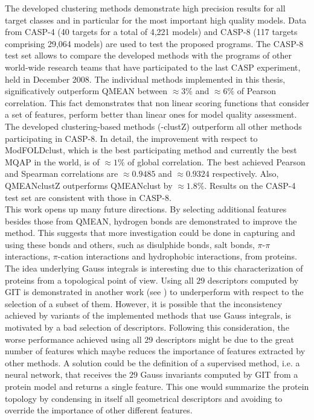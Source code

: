 The developed clustering methods demonstrate high precision results for all target classes and in particular for the most important high quality models. Data from CASP-4 (40 targets for a total of 4,221 models) and CASP-8 (117 targets comprising 29,064 models) are used to test the proposed programs. The CASP-8 test set allows to compare the developed methods with the programs of other world-wide research teams that have participated to the last CASP experiment, held in December 2008. The individual methods implemented in this thesis, significatively outperform QMEAN between $\approx 3\%$ and $\approx 6\%$ of Pearson correlation. This fact demonstrates that non linear scoring functions that consider a set of features, perform better than linear ones for model quality assessment. The developed clustering-based methods (-clustZ) outperform all other methods participating in CASP-8. In detail, the improvement with respect to ModFOLDclust, which is the best participating method and currently the best MQAP in the world, is of $\approx 1\%$ of global correlation. The best achieved Pearson and Spearman correlations are $\approx 0.9485$ and $\approx 0.9324$ respectively. Also, QMEAN\-clustZ outperforms QMEAN\-clust by $\approx 1.8\%$. Results on the CASP-4 test set are consistent with those in CASP-8.\\
This work opens up many future directions. By selecting additional features besides those from QMEAN, hydrogen bonds are demonstrated to improve the method. This suggests that more investigation could be done in capturing and using these bonds and others, such as disulphide bonds, salt bonds, $\pi$-$\pi$ interactions, $\pi$-cation interactions and hydrophobic interactions, from proteins. The idea underlying Gauss integrals is interesting due to this characterization of proteins from a topological point of view. Using all $29$ descriptors computed by GIT is demonstrated in another work (see \cite{Bau2008}) to underperform with respect to the selection of a subset of them. However, it is possible that the inconsistency achieved by variants of the implemented methods that use Gauss integrals, is motivated by a bad selection of descriptors. Following this consideration, the worse performance achieved using all $29$ descriptors might be due to the great number of features which maybe reduces the importance of features extracted by other methods. A solution could be the definition of a supervised method, i.e. a neural network, that receives the $29$ Gauss invariants computed by GIT from a protein model and returns a single feature. This one would summarize the protein topology by condensing in itself all geometrical descriptors and avoiding to override the importance of other different features.\\
